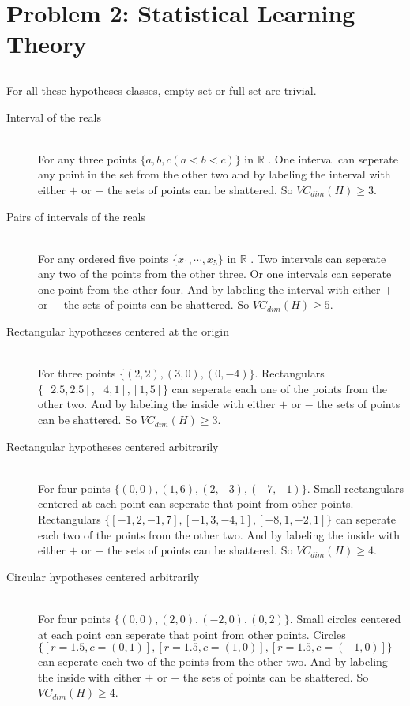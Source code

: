 \documentclass[letterpaper,11pt]{article}
\begin{document}
\section{Problem 2: Statistical Learning Theory}
\subsection{}
For all these hypotheses classes, empty set or full set are trivial.
\begin{description}
  \item[Interval of the reals] \hfill \\
    For any three points $\{a,b,c (a<b<c)\}$ in $\mathbb{R}$ .
    One interval can seperate any point in the set from the other two and by labeling the
    interval with either $+$ or $-$ the sets of points can be shattered.
    So $VC_{dim}(H) \ge 3$.
  \item[Pairs of intervals of the reals]\hfill \\
    For any ordered five points $\{x_1,\cdots, x_5\}$ in $\mathbb{R}$ .
    Two intervals can seperate any two of the points from the other three. Or
    one intervals can seperate one point from the other four. And by labeling the
    interval with either $+$ or $-$ the sets of points can be shattered.
    So $VC_{dim}(H) \ge 5$.
  \item[Rectangular hypotheses centered at the origin]\hfill \\
    For three points $\{(2,2),(3,0),(0,-4)\}$. Rectangulars
    $\{[2.5,2.5],[4,1],[1,5]\}$ can seperate each one of the points from the other
    two. And by labeling the inside with either $+$ or $-$ the sets of points can be shattered.
    So $VC_{dim}(H) \ge 3$.
  \item[Rectangular hypotheses centered arbitrarily]\hfill \\
    For four points $\{(0,0),(1,6),(2,-3),(-7,-1)\}$. Small rectangulars
    centered at each point can seperate that point from other points.
    Rectangulars $\{[-1,2,-1,7],[-1,3,-4,1],[-8,1,-2,1]\}$ can seperate 
    each two of the points from the other two. And by labeling the inside 
    with either $+$ or $-$ the sets of points can be shattered.
    So $VC_{dim}(H) \ge 4$.
  \item[Circular hypotheses centered arbitrarily]\hfill \\
    For four points $\{(0,0),(2,0),(-2,0),(0,2)\}$. Small circles 
    centered at each point can seperate that point from other points.
    Circles $\{[r=1.5,c=(0,1)],[r=1.5,c=(1,0)],[r=1.5,c=(-1,0)]\}$ can seperate 
    each two of the points from the other two. And by labeling the inside 
    with either $+$ or $-$ the sets of points can be shattered.
    So $VC_{dim}(H) \ge 4$.

\end{description}
\end{document}
